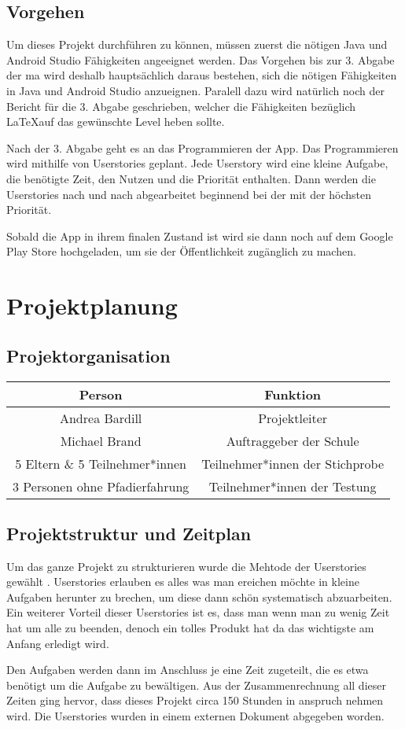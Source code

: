 \documentclass{report}
\begin{document}
\section{Vorgehen}
Um dieses Projekt durchführen zu können, müssen zuerst die nötigen Java und Android Studio Fähigkeiten angeeignet werden. Das Vorgehen bis zur 3. Abgabe der \gls{ma} wird deshalb hauptsächlich daraus bestehen, sich die nötigen Fähigkeiten in Java und Android Studio anzueignen. Paralell dazu wird natürlich noch der Bericht für die 3. Abgabe geschrieben, welcher die Fähigkeiten bezüglich \LaTeX auf das gewünschte Level heben sollte. \par
Nach der 3. Abgabe geht es an das Programmieren der App. Das Programmieren wird mithilfe von Userstories geplant. Jede Userstory wird eine kleine Aufgabe, die benötigte Zeit, den Nutzen und die Priorität enthalten. Dann werden die Userstories nach und nach abgearbeitet beginnend bei der mit der höchsten Priorität. \par
Sobald die App in ihrem finalen Zustand ist wird sie dann noch auf dem Google Play Store hochgeladen, um sie der Öffentlichkeit zugänglich zu machen.

\chapter{Projektplanung}

\section{Projektorganisation}
\begin{center}
\begin{tabular}{c|c}
    \textbf{Person} & \textbf{Funktion} \\ \hline
    Andrea Bardill & Projektleiter \\
    Michael Brand & Auftraggeber der Schule \\
    5 Eltern \& 5 Teilnehmer*innen & Teilnehmer*innen der Stichprobe \\
    3 Personen ohne Pfadierfahrung & Teilnehmer*innen der Testung
\end{tabular}
\end{center}

\section{Projektstruktur und Zeitplan}
Um das ganze Projekt zu strukturieren wurde die Mehtode der Userstories gewählt \cite{userstories}. Userstories erlauben es alles was man ereichen möchte in kleine Aufgaben herunter zu brechen, um diese dann schön systematisch abzuarbeiten. Ein weiterer Vorteil dieser Userstories ist es, dass man wenn man zu wenig Zeit hat um alle zu beenden, denoch ein tolles Produkt hat da das wichtigste am Anfang erledigt wird. \par Den Aufgaben werden dann im Anschluss je eine Zeit zugeteilt, die es etwa benötigt um die Aufgabe zu bewältigen. Aus der Zusammenrechnung all dieser Zeiten ging hervor, dass dieses Projekt circa 150 Stunden in anspruch nehmen wird. Die Userstories wurden in einem externen Dokument abgegeben worden.
\end{document}
